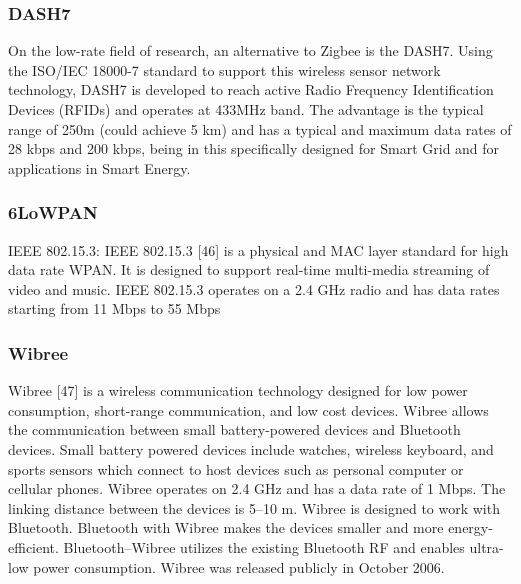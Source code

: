 

\subsubsection{DASH7}

On the low-rate field of research, an alternative to Zigbee is the DASH7. Using the ISO/IEC 18000-7 standard to support this wireless sensor network technology, DASH7 is developed to reach active Radio Frequency Identification Devices (RFIDs) and operates at 433MHz band. The advantage is the typical range of 250m (could achieve 5 km) and has a typical and maximum data rates of 28 kbps and 200 kbps, being in this specifically designed for Smart Grid and for applications in Smart Energy.


\subsubsection{6LoWPAN}

IEEE 802.15.3: IEEE 802.15.3 [46] is a physical and MAC
layer standard for high data rate WPAN. It is designed to
support real-time multi-media streaming of video and music.
IEEE 802.15.3 operates on a 2.4 GHz radio and has data
rates starting from 11 Mbps to 55 Mbps

\subsubsection{Wibree}

Wibree [47] is a wireless communication technology
designed for low power consumption, short-range
communication, and low cost devices. Wibree allows the
communication between small battery-powered devices
and Bluetooth devices. Small battery powered devices include
watches, wireless keyboard, and sports sensors
which connect to host devices such as personal computer
or cellular phones. Wibree operates on 2.4 GHz and has a
data rate of 1 Mbps. The linking distance between the devices
is 5–10 m. Wibree is designed to work with Bluetooth.
Bluetooth with Wibree makes the devices smaller
and more energy-efficient. Bluetooth–Wibree utilizes the existing Bluetooth RF and enables ultra-low power consumption.
Wibree was released publicly in October 2006.


